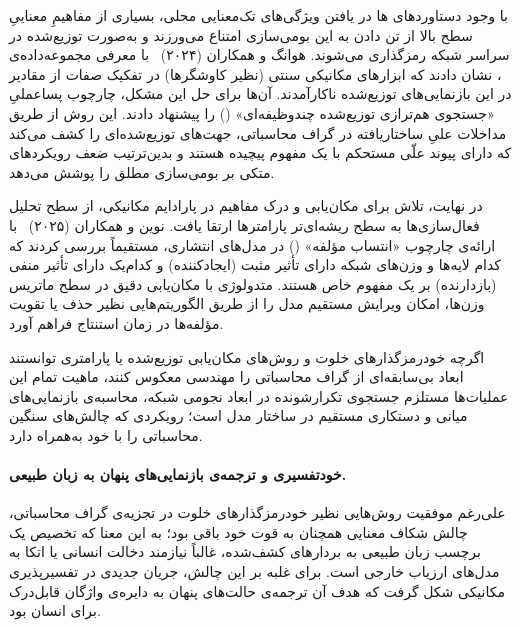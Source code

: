 با وجود دستاوردهای ها در یافتن ویژگی‌های تک‌معنایی محلی، بسیاری از مفاهیمِ معناییِ سطح بالا از تن دادن به این بومی‌سازی امتناع می‌ورزند و به‌صورت توزیع‌شده در سراسر شبکه رمزگذاری می‌شوند. هوانگ و همکاران (۲۰۲۴)~\cite{huang2024ravel} با معرفی مجموعه‌داده‌ی ، نشان دادند که ابزارهای مکانیکی سنتی (نظیر کاوشگرها) در تفکیک صفات از مقادیر در این بازنمایی‌های توزیع‌شده ناکارآمدند. آن‌ها برای حل این مشکل، چارچوب پساعملیِ «جستجوی هم‌ترازی توزیع‌شده چندوظیفه‌ای» () را پیشنهاد دادند. این روش از طریق مداخلات علیِ ساختاریافته در گراف محاسباتی، جهت‌های توزیع‌شده‌ای را کشف می‌کند که دارای پیوند علّی مستحکم با یک مفهوم پیچیده هستند و بدین‌ترتیب ضعف رویکردهای متکی بر بومی‌سازی مطلق را پوشش می‌دهد.

در نهایت، تلاش برای مکان‌یابی و درک مفاهیم در پارادایم مکانیکی، از سطح تحلیل فعال‌سازی‌ها به سطح ریشه‌ای‌تر پارامترها ارتقا یافت. نوین و همکاران (۲۰۲۵)~\cite{nguyen2025unveiling} با ارائه‌ی چارچوب «انتساب مؤلفه» () در مدل‌های انتشاری، مستقیماً بررسی کردند که کدام لایه‌ها و وزن‌های شبکه دارای تأثیر مثبت (ایجادکننده) و کدام‌یک دارای تأثیر منفی (بازدارنده) بر یک مفهوم خاص هستند. متدولوژی  با مکان‌یابی دقیق در سطح ماتریس وزن‌ها، امکان ویرایش مستقیم مدل را از طریق الگوریتم‌هایی نظیر حذف یا تقویت مؤلفه‌ها در زمان استنتاج فراهم آورد. 

اگرچه خودرمزگذارهای خلوت و روش‌های مکان‌یابی توزیع‌شده یا پارامتری توانستند ابعاد بی‌سابقه‌ای از گراف محاسباتی را مهندسی معکوس کنند، ماهیت تمام این عملیات‌ها مستلزم جستجوی تکرارشونده در ابعاد نجومی شبکه، محاسبه‌ی بازنمایی‌های میانی و دستکاری مستقیم در ساختار مدل است؛ رویکردی که چالش‌های سنگین محاسباتی را با خود به‌همراه دارد.

\paragraph{خودتفسیری و ترجمه‌ی بازنمایی‌های پنهان به زبان طبیعی.}

علی‌رغم موفقیت روش‌هایی نظیر خودرمزگذارهای خلوت در تجزیه‌ی گراف محاسباتی، چالش شکاف معنایی همچنان به قوت خود باقی بود؛ به این معنا که تخصیص یک برچسب زبان طبیعی به بردارهای کشف‌شده، غالباً نیازمند دخالت انسانی یا اتکا به مدل‌های ارزیاب خارجی است. برای غلبه بر این چالش، جریان جدیدی در تفسیرپذیری مکانیکی شکل گرفت که هدف آن ترجمه‌ی حالت‌های پنهان به دایره‌ی واژگان قابل‌درک برای انسان بود.

